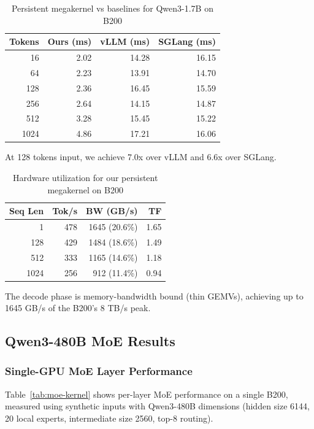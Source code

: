 \documentclass[sigplan,screen]{acmart}
\begin{document}
\begin{table}[h]
  \caption{Persistent megakernel vs baselines for Qwen3-1.7B on B200}
  \label{tab:1}
  \small
  \begin{tabular}{rrrr}
    \toprule
    Tokens & Ours (ms) & vLLM (ms) & SGLang (ms) \\
    \midrule
    16   & 2.02 & 14.28 & 16.15 \\
    64   & 2.23 & 13.91 & 14.70 \\
    128  & 2.36 & 16.45 & 15.59 \\
    256  & 2.64 & 14.15 & 14.87 \\
    512  & 3.28 & 15.45 & 15.22 \\
    1024 & 4.86 & 17.21 & 16.06 \\
    \bottomrule
  \end{tabular}
\end{table}

At 128 tokens input, we achieve 7.0x over vLLM and 6.6x over SGLang.

\begin{table}[h]
  \caption{Hardware utilization for our persistent megakernel on B200}
  \label{tab:2}
  \small
  \begin{tabular}{rrrr}
    \toprule
    Seq Len & Tok/s & BW (GB/s) & TF \\
    \midrule
    1    & 478 & 1645 (20.6\%) & 1.65 \\
    128  & 429 & 1484 (18.6\%) & 1.49 \\
    512  & 333 & 1165 (14.6\%) & 1.18 \\
    1024 & 256 & 912 (11.4\%)  & 0.94 \\
    \bottomrule
  \end{tabular}
\end{table}

The decode phase is memory-bandwidth bound (thin GEMVs), achieving up to 1645 GB/s of the B200's 8 TB/s peak.

\subsection{Qwen3-480B MoE Results}

\subsubsection{Single-GPU MoE Layer Performance}

Table~\ref{tab:moe-kernel} shows per-layer MoE performance on a single B200, measured using synthetic inputs with Qwen3-480B dimensions (hidden size 6144, 20 local experts, intermediate size 2560, top-8 routing).
\end{document}
